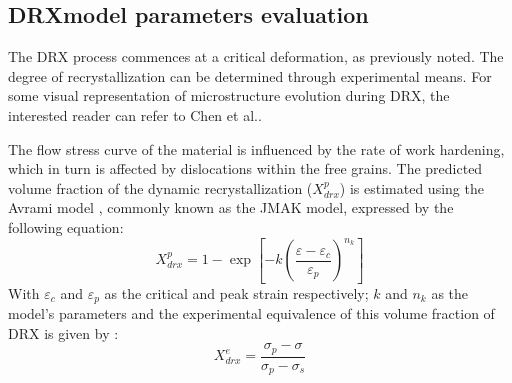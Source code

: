 \documentclass[metals,article,submit,pdftex,moreauthors]{Definitions/mdpi}
\makeatletter
\DeclareRobustCommand{\eal}{et al.\@\xspace}
\makeatother
\begin{document}
\subsection{DRXmodel parameters evaluation\label{subsec:DRXparams}}

The DRX process commences at a critical deformation, as previously noted.
The degree of recrystallization can be determined through experimental means.
For some visual representation of microstructure evolution during DRX, the interested reader can refer to Chen \eal \cite{Chen-2019}.

The flow stress curve of the material is influenced by the rate of work hardening, which in turn is affected by dislocations within the free grains.
The predicted volume fraction of the dynamic recrystallization ($X_{drx}^{p}$) is estimated using the Avrami model \cite{Avrami-1939} , commonly known as the JMAK model, expressed by the following equation:
\begin{equation}
X_{drx}^{p} = 1 - \exp\left[ -k\left(\frac{\varepsilon - \varepsilon_c}{\varepsilon_p}\right)^{n_k}\right]
\label{eq:drxpred}
\end{equation}
With $\varepsilon_c$ and $\varepsilon_p$ as the critical and peak strain respectively; $k$ and $n_k$ as the model's parameters and the experimental equivalence of this volume fraction of DRX is given by :
\begin{equation}
X_{drx}^{e} = \frac{\sigma_p-\sigma}{\sigma_p-\sigma_{s}}
\label{eq:drxexp}
\end{equation}
\end{document}
